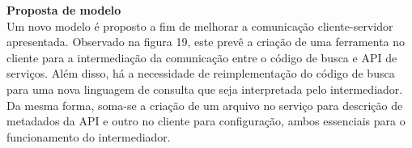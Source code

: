 \textbf{Proposta de modelo} \\

Um novo modelo é proposto a fim de melhorar a comunicação cliente-servidor apresentada. Observado na figura 19, este prevê a criação de uma ferramenta no cliente para a intermediação da comunicação entre o código de busca e API de serviços. Além disso, há a necessidade de reimplementação do código de busca para uma nova linguagem de consulta que seja interpretada pelo intermediador. Da mesma forma, soma-se a criação de um arquivo no serviço para descrição de metadados da API e outro no cliente para configuração, ambos essenciais para o funcionamento do intermediador.

\begin{figure}[H]
  \centering
\end{figure}
